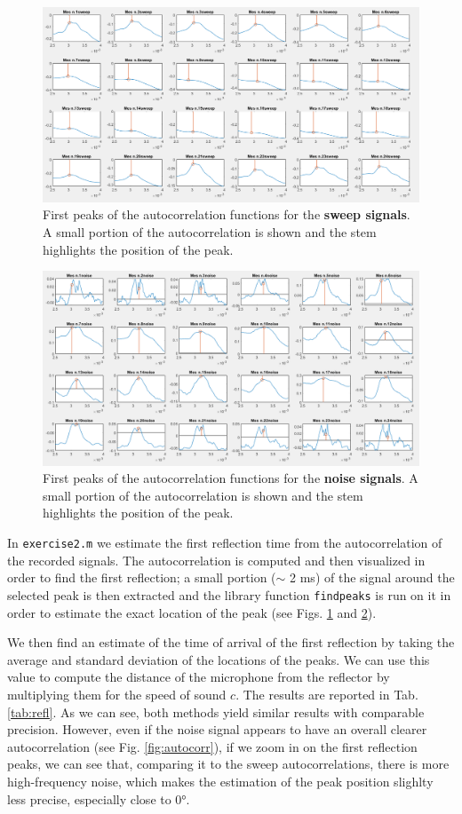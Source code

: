 \documentclass[a4paper]{article}
\begin{document}
\begin{figure}[h]
	\centering
	\includegraphics[width=0.85\linewidth]{sweep_peaks.png}
	\caption{First peaks of the autocorrelation functions for the \textbf{sweep signals}. A small portion of the autocorrelation is shown and the stem highlights the position of the peak.}
	\label{fig:sweepcorr}
\end{figure}

\begin{figure}[h]
	\centering
	\includegraphics[width=0.85\linewidth]{noise_peaks.png}
	\caption{First peaks of the autocorrelation functions for the \textbf{noise signals}. A small portion of the autocorrelation is shown and the stem highlights the position of the peak.}
	\label{fig:noisecorr}
\end{figure}


In \verb|exercise2.m| we estimate the first reflection time from the autocorrelation of the recorded signals. The autocorrelation is computed and then visualized in order to find the first reflection; a small portion ($\sim$ 2 ms) of the signal around the selected peak is then extracted and the library function \verb|findpeaks| is run on it in order to estimate the exact location of the peak (see Figs. \ref{fig:sweepcorr} and \ref{fig:noisecorr}).

We then find an estimate of the time of arrival of the first reflection by taking the average and standard deviation of the locations of the peaks.  We can use this value to compute the distance of the microphone from the reflector by multiplying them for the speed of sound $c$. The results are reported in Tab. \ref{tab:refl}. As we can see, both methods yield similar results with comparable precision. However, even if the noise signal appears to have an overall clearer autocorrelation (see Fig. \ref{fig:autocorr}), if we zoom in on the first reflection peaks, we can see that, comparing it to the  sweep autocorrelations, there is more high-frequency noise, which makes the estimation of the peak position slighlty less precise, especially close to 0°.
\end{document}
